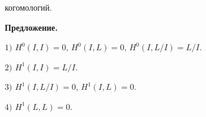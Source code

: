 когомологий. 


\medskip 


 


{\bf Предложение.} 


 


$1)$ $H^{0}(I,I)=0$, $H^{0}(I,L)=0$, $H^{0}(I,L/I)=L/I$. 


 


$2)$ $H^{1}(I,I)=L/I$. 


 


$3)$ $H^{1}(I,L/I)=0$, $H^{1}(I,L)=0$. 


 


$4)$ $H^{1}(L,L)=0$. 


 


